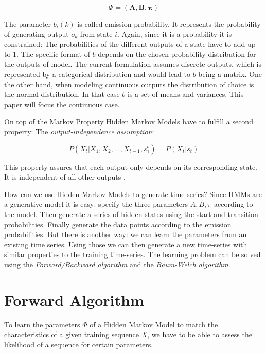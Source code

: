 \begin{equation}
\Phi=(\mathbf{A}, \mathbf{B}, \boldsymbol{\pi})
\end{equation}

The parameter $b_{i}(k)$ is called emission probability. It represents the probability of generating output $o_k$ from state $i$. Again, since it is a probability it is constrained: The probabilities of the different outputs of a state have to add up to 1. The specific format of $b$ depends on the chosen probability distribution for the outputs of model. 
The current formulation assumes discrete outputs, which is represented by a categorical distribution and would lead to $b$ being a matrix. One the other hand, when modeling continuous outputs the distribution of choice is the normal distribution. In that case $b$ is a set of means and variances. This paper will focus the continuous case.

On top of the Markov Property Hidden Markov Models have to fulfill a second property: The \emph{output-independence assumption}:

\begin{equation}
P\left(X_{t} |X_{1}, X_{2}, \ldots, X_{t-1}, s_{1}^{t}\right)=P\left(X_{t} | s_{t}\right)
\end{equation}

This property assures that each output only depends on its corresponding state. It is independent of all other outputs \parencite{huang2001spoken}.

How can we use Hidden Markov Models to generate time series? Since HMMs are a generative model it is easy: specify the three parameters $A, B, \pi$ according to the model. Then generate a series of hidden states using the start and transition probabilities. Finally generate the data points according to the emission probabilities. But there is another way: we can learn the parameters from an existing time series. Using those we can then generate a new time-series with similar properties to the training time-series. The learning problem can be solved using the \emph{Forward/Backward algorithm} and the \emph{Baum-Welch algorithm}.

\section{Forward Algorithm}

To learn the parameters $\Phi$ of a Hidden Markov Model to match the characteristics of a given training sequence $X$, we have to be able to assess the likelihood of a sequence for certain parameters. 

